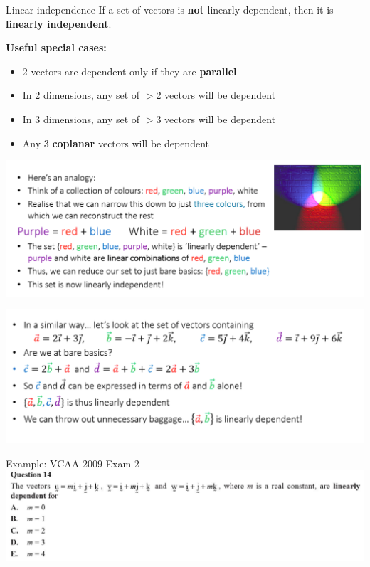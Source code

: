 \documentclass{beamer}
\begin{document}
\begin{frame}{Linear independence}
	If a set of vectors is \textbf{not} linearly dependent, then it is \textbf{linearly independent}.
	
	\textbf{Useful special cases:}
	\begin{itemize}
		\item 2 vectors are dependent only if they are \textbf{parallel}
		\item In 2 dimensions, any set of $>$2 vectors will be dependent
		\item In 3 dimensions, any set of $>$3 vectors will be dependent
		\item Any 3 \textbf{coplanar} vectors will be dependent
	\end{itemize}
\end{frame}

\begin{frame}
	\includegraphics[width = \linewidth]{img/indep_1.png}
\end{frame}

\begin{frame}
	\includegraphics[width = \linewidth]{img/indep_2.png}
\end{frame}

\begin{frame}
	Example: VCAA 2009 Exam 2
	\includegraphics[width = \linewidth]{img/q1.png}
\end{frame}
\end{document}
